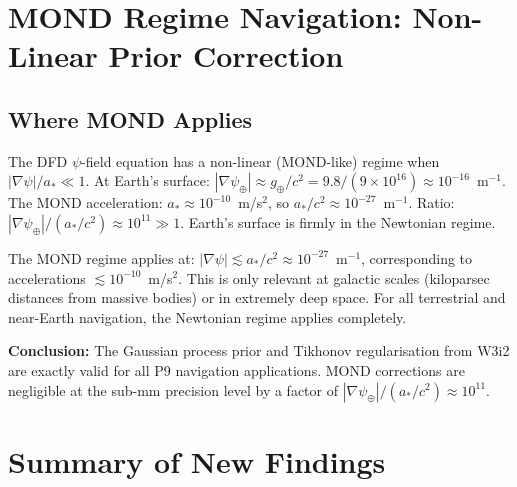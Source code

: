 \documentclass[aps,prd,twocolumn,superscriptaddress,nofootinbib]{revtex4-2}
\newcommand{\astar}{a_*}
\begin{document}
\section{MOND Regime Navigation: Non-Linear Prior Correction}
\label{sec:mond}

\subsection{Where MOND Applies}

The DFD $\psi$-field equation has a non-linear (MOND-like) regime when
$|\nabla\psi|/\astar \ll 1$.  At Earth's surface:
$|\nabla\psi_\oplus| \approx g_\oplus/c^2 = 9.8/(9\times10^{16})
\approx 10^{-16}$~m$^{-1}$.
The MOND acceleration: $\astar \approx 10^{-10}$~m/s$^2$,
so $\astar/c^2 \approx 10^{-27}$~m$^{-1}$.
Ratio: $|\nabla\psi_\oplus|/(\astar/c^2) \approx 10^{11} \gg 1$.
Earth's surface is firmly in the Newtonian regime.

The MOND regime applies at:
$|\nabla\psi| \lesssim \astar/c^2 \approx 10^{-27}$~m$^{-1}$,
corresponding to accelerations $\lesssim 10^{-10}$~m/s$^2$.
This is only relevant at galactic scales (kiloparsec distances from
massive bodies) or in extremely deep space.  For all terrestrial and
near-Earth navigation, the Newtonian regime applies completely.

\textbf{Conclusion:} The Gaussian process prior and Tikhonov
regularisation from W3i2 are exactly valid for all P9 navigation
applications.  MOND corrections are negligible at the sub-mm precision
level by a factor of $|\nabla\psi_\oplus|/(\astar/c^2) \approx 10^{11}$.

\section{Summary of New Findings}
\label{sec:summary}
\end{document}
